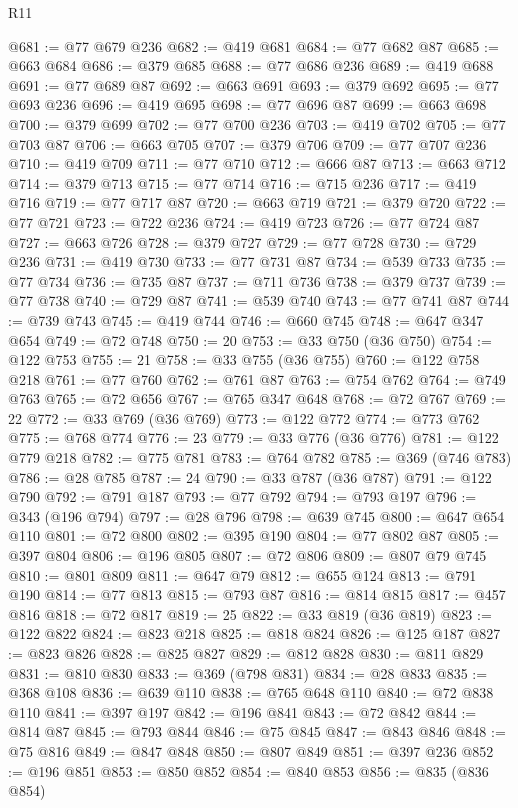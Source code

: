 \begin{lexlean}{R11}
\begin{coremodule}
@681 := @77 @679 @236
@682 := @419 @681
@684 := @77 @682 @87
@685 := @663 @684
@686 := @379 @685
@688 := @77 @686 @236
@689 := @419 @688
@691 := @77 @689 @87
@692 := @663 @691
@693 := @379 @692
@695 := @77 @693 @236
@696 := @419 @695
@698 := @77 @696 @87
@699 := @663 @698
@700 := @379 @699
@702 := @77 @700 @236
@703 := @419 @702
@705 := @77 @703 @87
@706 := @663 @705
@707 := @379 @706
@709 := @77 @707 @236
@710 := @419 @709
@711 := @77 @710
@712 := @666 @87
@713 := @663 @712
@714 := @379 @713
@715 := @77 @714
@716 := @715 @236
@717 := @419 @716
@719 := @77 @717 @87
@720 := @663 @719
@721 := @379 @720
@722 := @77 @721
@723 := @722 @236
@724 := @419 @723
@726 := @77 @724 @87
@727 := @663 @726
@728 := @379 @727
@729 := @77 @728
@730 := @729 @236
@731 := @419 @730
@733 := @77 @731 @87
@734 := @539 @733
@735 := @77 @734
@736 := @735 @87
@737 := @711 @736
@738 := @379 @737
@739 := @77 @738
@740 := @729 @87
@741 := @539 @740
@743 := @77 @741 @87
@744 := @739 @743
@745 := @419 @744
@746 := @660 @745
@748 := @647 @347 @654
@749 := @72 @748
@750 := 20
@753 := @33 @750 (@36 @750)
@754 := @122 @753
@755 := 21
@758 := @33 @755 (@36 @755)
@760 := @122 @758 @218
@761 := @77 @760
@762 := @761 @87
@763 := @754 @762
@764 := @749 @763
@765 := @72 @656
@767 := @765 @347 @648
@768 := @72 @767
@769 := 22
@772 := @33 @769 (@36 @769)
@773 := @122 @772
@774 := @773 @762
@775 := @768 @774
@776 := 23
@779 := @33 @776 (@36 @776)
@781 := @122 @779 @218
@782 := @775 @781
@783 := @764 @782
@785 := @369 (@746 @783)
@786 := @28 @785
@787 := 24
@790 := @33 @787 (@36 @787)
@791 := @122 @790
@792 := @791 @187
@793 := @77 @792
@794 := @793 @197
@796 := @343 (@196 @794)
@797 := @28 @796
@798 := @639 @745
@800 := @647 @654 @110
@801 := @72 @800
@802 := @395 @190
@804 := @77 @802 @87
@805 := @397 @804
@806 := @196 @805
@807 := @72 @806
@809 := @807 @79 @745
@810 := @801 @809
@811 := @647 @79
@812 := @655 @124
@813 := @791 @190
@814 := @77 @813
@815 := @793 @87
@816 := @814 @815
@817 := @457 @816
@818 := @72 @817
@819 := 25
@822 := @33 @819 (@36 @819)
@823 := @122 @822
@824 := @823 @218
@825 := @818 @824
@826 := @125 @187
@827 := @823 @826
@828 := @825 @827
@829 := @812 @828
@830 := @811 @829
@831 := @810 @830
@833 := @369 (@798 @831)
@834 := @28 @833
@835 := @368 @108
@836 := @639 @110
@838 := @765 @648 @110
@840 := @72 @838 @110
@841 := @397 @197
@842 := @196 @841
@843 := @72 @842
@844 := @814 @87
@845 := @793 @844
@846 := @75 @845
@847 := @843 @846
@848 := @75 @816
@849 := @847 @848
@850 := @807 @849
@851 := @397 @236
@852 := @196 @851
@853 := @850 @852
@854 := @840 @853
@856 := @835 (@836 @854)

\end{coremodule}
\end{lexlean}
